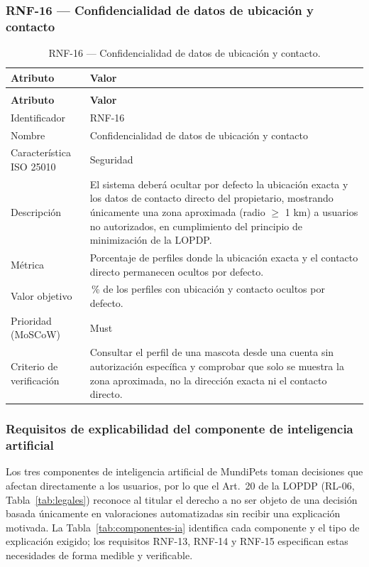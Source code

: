 \documentclass[journal,onecolumn]{IEEEtran}
\makeatletter
\newenvironment{atributos}[2]{%
	\small
	\begin{longtable}{@{}>{\raggedright\arraybackslash}p{4.2cm} >{\raggedright\arraybackslash}p{11.2cm}@{}}
		\caption{#2}\label{tab:#1}\\
		\toprule
		\textbf{Atributo} & \textbf{Valor} \\
		\midrule
		\endfirsthead
		\multicolumn{2}{@{}l}{\small\itshape (continuación)}\\
		\toprule
		\textbf{Atributo} & \textbf{Valor} \\
		\midrule
		\endhead
		\bottomrule
		\endlastfoot
	}{%
	\end{longtable}
	\normalsize
}
\makeatother
\begin{document}
	
	\subsubsection{RNF-16 --- Confidencialidad de datos de ubicación y contacto}
	
	\begin{atributos}{RNF-16}{RNF-16 --- Confidencialidad de datos de ubicación y contacto.}
		Identificador & RNF-16 \\
		Nombre & Confidencialidad de datos de ubicación y contacto \\
		Característica ISO 25010 & Seguridad \\
		Descripción & El sistema deberá ocultar por defecto la ubicación exacta y los datos de contacto directo del propietario, mostrando únicamente una zona aproximada (radio $\geq$ 1 km) a usuarios no autorizados, en cumplimiento del principio de minimización de la LOPDP. \\
		Métrica & Porcentaje de perfiles donde la ubicación exacta y el contacto directo permanecen ocultos por defecto. \\
		Valor objetivo & 100\,\% de los perfiles con ubicación y contacto ocultos por defecto. \\
		Prioridad (MoSCoW) & Must \\
		Criterio de verificación & Consultar el perfil de una mascota desde una cuenta sin autorización específica y comprobar que solo se muestra la zona aproximada, no la dirección exacta ni el contacto directo. \\
	\end{atributos}
	
	\subsubsection{Requisitos de explicabilidad del componente de inteligencia artificial}
	\label{sec:explicabilidad}
	
	Los tres componentes de inteligencia artificial de MundiPets toman decisiones
	que afectan directamente a los usuarios, por lo que el Art.~20 de la LOPDP
	(RL-06, Tabla~\ref{tab:legales}) reconoce al titular el derecho a no ser objeto
	de una decisión basada únicamente en valoraciones automatizadas sin recibir una
	explicación motivada. La Tabla~\ref{tab:componentes-ia} identifica cada
	componente y el tipo de explicación exigido; los requisitos RNF-13, RNF-14 y
	RNF-15 especifican estas necesidades de forma medible y verificable.
	
\end{document}
